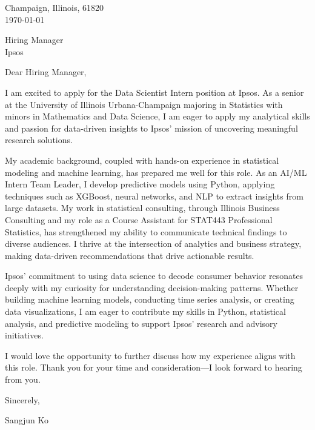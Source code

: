 \documentclass[11pt]{article}
\begin{document}
\noindent
Champaign, Illinois, 61820 \\
\today
\vspace{2em}

\noindent
Hiring Manager \\
Ipsos

\vspace{1.5em}

Dear Hiring Manager,

I am excited to apply for the Data Scientist Intern position at Ipsos. As a senior at the University of Illinois Urbana-Champaign majoring in Statistics with minors in Mathematics and Data Science, I am eager to apply my analytical skills and passion for data-driven insights to Ipsos’ mission of uncovering meaningful research solutions.

My academic background, coupled with hands-on experience in statistical modeling and machine learning, has prepared me well for this role. As an AI/ML Intern Team Leader, I develop predictive models using Python, applying techniques such as XGBoost, neural networks, and NLP to extract insights from large datasets. My work in statistical consulting, through Illinois Business Consulting and my role as a Course Assistant for STAT443 Professional Statistics, has strengthened my ability to communicate technical findings to diverse audiences. I thrive at the intersection of analytics and business strategy, making data-driven recommendations that drive actionable results.

Ipsos’ commitment to using data science to decode consumer behavior resonates deeply with my curiosity for understanding decision-making patterns. Whether building machine learning models, conducting time series analysis, or creating data visualizations, I am eager to contribute my skills in Python, statistical analysis, and predictive modeling to support Ipsos’ research and advisory initiatives.

I would love the opportunity to further discuss how my experience aligns with this role. Thank you for your time and consideration—I look forward to hearing from you.



\vspace{1em}

Sincerely,

\vspace{2em}

Sangjun Ko
\end{document}
